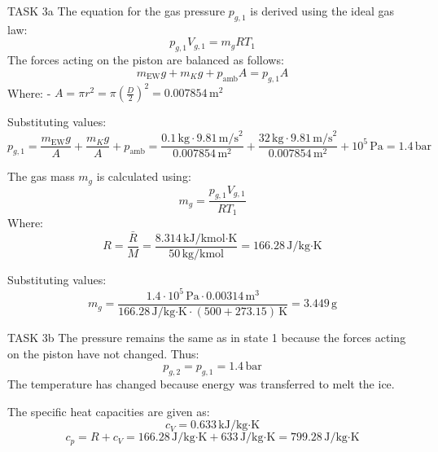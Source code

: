 TASK 3a  
The equation for the gas pressure \( p_{g,1} \) is derived using the ideal gas law:  
\[
p_{g,1} V_{g,1} = m_g R T_1
\]  
The forces acting on the piston are balanced as follows:  
\[
m_{\text{EW}} g + m_K g + p_{\text{amb}} A = p_{g,1} A
\]  
Where:  
- \( A = \pi r^2 = \pi \left( \frac{D}{2} \right)^2 = 0.007854 \, \text{m}^2 \)  

Substituting values:  
\[
p_{g,1} = \frac{m_{\text{EW}} g}{A} + \frac{m_K g}{A} + p_{\text{amb}} = \frac{0.1 \, \text{kg} \cdot 9.81 \, \text{m/s}^2}{0.007854 \, \text{m}^2} + \frac{32 \, \text{kg} \cdot 9.81 \, \text{m/s}^2}{0.007854 \, \text{m}^2} + 10^5 \, \text{Pa} = 1.4 \, \text{bar}
\]  

The gas mass \( m_g \) is calculated using:  
\[
m_g = \frac{p_{g,1} V_{g,1}}{R T_1}
\]  
Where:  
\[
R = \frac{\bar{R}}{M} = \frac{8.314 \, \text{kJ/kmol·K}}{50 \, \text{kg/kmol}} = 166.28 \, \text{J/kg·K}
\]  

Substituting values:  
\[
m_g = \frac{1.4 \cdot 10^5 \, \text{Pa} \cdot 0.00314 \, \text{m}^3}{166.28 \, \text{J/kg·K} \cdot (500 + 273.15) \, \text{K}} = 3.449 \, \text{g}
\]  

TASK 3b  
The pressure remains the same as in state 1 because the forces acting on the piston have not changed. Thus:  
\[
p_{g,2} = p_{g,1} = 1.4 \, \text{bar}
\]  
The temperature has changed because energy was transferred to melt the ice.  

The specific heat capacities are given as:  
\[
c_V = 0.633 \, \text{kJ/kg·K}
\]  
\[
c_p = R + c_V = 166.28 \, \text{J/kg·K} + 633 \, \text{J/kg·K} = 799.28 \, \text{J/kg·K}
\]